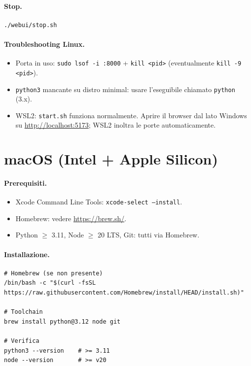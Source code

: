 \paragraph{Stop.}
\begin{lstlisting}[style=shell]
./webui/stop.sh
\end{lstlisting}

\paragraph{Troubleshooting Linux.}
\begin{itemize}
  \item Porta in uso: \texttt{sudo lsof -i :8000} + \texttt{kill <pid>}
        (eventualmente \texttt{kill -9 <pid>}).
  \item \texttt{python3} mancante su distro minimal: usare
        l'eseguibile chiamato \texttt{python} (3.x).
  \item WSL2: \texttt{start.sh} funziona normalmente. Aprire il
        browser dal lato Windows su
        \url{http://localhost:5173}; WSL2 inoltra le porte
        automaticamente.
\end{itemize}

\section{macOS (Intel + Apple Silicon)}

\paragraph{Prerequisiti.}
\begin{itemize}
  \item Xcode Command Line Tools: \texttt{xcode-select --install}.
  \item Homebrew: vedere \url{https://brew.sh/}.
  \item Python $\geq$ 3.11, Node $\geq$ 20 LTS, Git: tutti via Homebrew.
\end{itemize}

\paragraph{Installazione.}
\begin{lstlisting}[style=shell]
# Homebrew (se non presente)
/bin/bash -c "$(curl -fsSL https://raw.githubusercontent.com/Homebrew/install/HEAD/install.sh)"

# Toolchain
brew install python@3.12 node git

# Verifica
python3 --version    # >= 3.11
node --version       # >= v20
\end{lstlisting}

